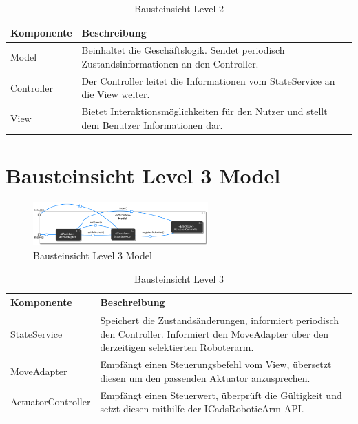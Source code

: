 \begin{table}[h!]
\centering
\begin{tabular}{|p{4cm}|p{9cm}|}
\hline
\textbf{Komponente} & \textbf{Beschreibung} \\ \hline
Model & Beinhaltet die Geschäftslogik. Sendet periodisch Zustandsinformationen an den Controller. \\ \hline
Controller &  Der Controller leitet die Informationen vom StateService an die View weiter. \\ \hline
View & Bietet Interaktionsmöglichkeiten für den Nutzer und stellt dem Benutzer Informationen dar. 
\end{tabular}
\caption{Bausteinsicht Level 2}
\label{tab:lvl2}
\end{table}
\newpage

\section{Bausteinsicht Level 3 Model}
\begin{figure}[h] %
    \centering
    \includegraphics[width=0.6\textwidth]{diagrams/baustein_lvl_3_model_v2.png}
    \caption{Bausteinsicht Level 3 Model}
\end{figure}

\begin{table}[h!]
\centering
\begin{tabular}{|p{4cm}|p{9cm}|}
\hline
\textbf{Komponente} & \textbf{Beschreibung} \\ \hline
StateService & Speichert die Zustandsänderungen, informiert periodisch den Controller. 
Informiert den MoveAdapter über den derzeitigen selektierten Roboterarm.\\ \hline
MoveAdapter  & Empfängt einen Steuerungsbefehl vom View, übersetzt diesen um den passenden Aktuator anzusprechen. \\ \hline
ActuatorController & Empfängt einen Steuerwert, überprüft die Gültigkeit und setzt diesen mithilfe der ICadsRoboticArm API. \\ \hline
\end{tabular}
\caption{Bausteinsicht Level 3}
\label{tab:lvl3}
\end{table}

